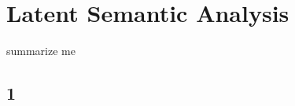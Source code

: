 \chapter{Latent Semantic Analysis}
\label{sec:lsa}

\begin{summary}
summarize me
\end{summary}

\section{1}
\label{sec:lsa:1}
